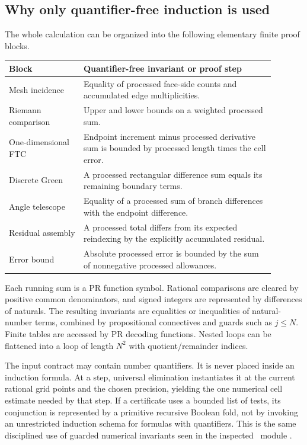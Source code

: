\subsection{Why only quantifier-free induction is used}

The whole calculation can be organized into the following elementary finite proof blocks.
\begin{center}
\begin{tabular}{p{0.25\linewidth}p{0.64\linewidth}}
\toprule
Block & Quantifier-free invariant or proof step\\
\midrule
Mesh incidence & Equality of processed face-side counts and accumulated edge multiplicities.\\
Riemann comparison & Upper and lower bounds on a weighted processed sum.\\
One-dimensional FTC & Endpoint increment minus processed derivative sum is bounded by processed length times the cell error.\\
Discrete Green & A processed rectangular difference sum equals its remaining boundary terms.\\
Angle telescope & Equality of a processed sum of branch differences with the endpoint difference.\\
Residual assembly & A processed total differs from its expected reindexing by the explicitly accumulated residual.\\
Error bound & Absolute processed error is bounded by the sum of nonnegative processed allowances.\\
\bottomrule
\end{tabular}
\end{center}

Each running sum is a PR function symbol. Rational comparisons are cleared by positive common denominators, and signed integers are represented by differences of naturals. The resulting invariants are equalities or inequalities of natural-number terms, combined by propositional connectives and guards such as $j\le N$. Finite tables are accessed by PR decoding functions. Nested loops can be flattened into a loop of length $N^2$ with quotient/remainder indices.

The input contract may contain number quantifiers. It is never placed inside an induction formula. At a step, universal elimination instantiates it at the current rational grid points and the chosen precision, yielding the one numerical cell estimate needed by that step. If a certificate uses a bounded list of tests, its conjunction is represented by a primitive recursive Boolean fold, not by invoking an unrestricted induction schema for formulas with quantifiers. This is the same disciplined use of guarded numerical invariants seen in the inspected \repo\ module  \cite{repo-ftc}.

